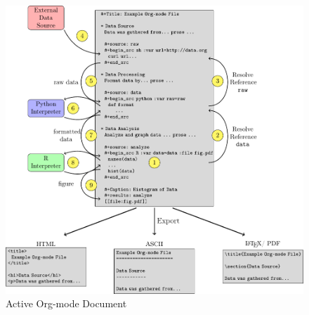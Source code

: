 \documentclass[11pt]{article}
\begin{document}
\begin{figure}[htb]
\centering
\includegraphics[width=\textwidth]{chained-evaluation.pdf}
\caption{\label{fig:chained-evaluation}Active Org-mode Document}
\end{figure}
\end{document}
